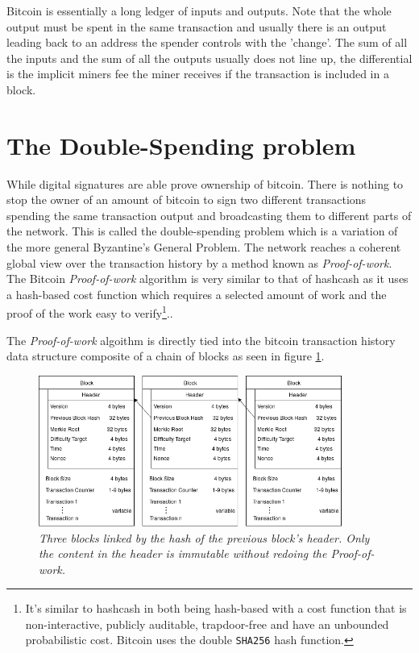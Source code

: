 Bitcoin is essentially a long ledger of inputs and outputs. Note that the whole output must be spent in the same transaction and usually there is an output leading back to an address the spender controls with the 'change'. The sum of all the inputs and the sum of all the outputs usually does not line up, the differential is the implicit miners fee the miner receives if the transaction is included in a block. 

\section{The Double-Spending problem}

While digital signatures are able prove ownership of bitcoin. There is nothing to stop the owner of an amount of bitcoin to sign two different transactions spending the same transaction output and broadcasting them to different parts of the network. This is called the double-spending problem which is a variation of the more general Byzantine's General Problem. The network reaches a coherent global view over the transaction history by a method known as \textit{Proof-of-work}. The Bitcoin \textit{Proof-of-work} algorithm is very similar to that of hashcash as it uses a hash-based cost function which requires a selected amount of work and the proof of the work easy to verify\cite{back:hashcash}\footnote{It's similar to hashcash in both being hash-based with a cost function that is non-interactive, publicly auditable, trapdoor-free and have an unbounded probabilistic cost\cite{back:hashcash}.
Bitcoin uses the double \texttt{SHA256} hash function.}..

The \textit{Proof-of-work} algoithm is directly tied into the bitcoin transaction history data structure composite of a chain of blocks as seen in figure \ref{fig:blockchain}.

\begin{figure}[!htb]
	\hspace*{-0.4cm} 
	\centering
	\includegraphics[width=10cm]{images/blockchain.png}
	\caption{\textit{Three blocks linked by the hash of the previous block's header. Only the content in the header is immutable without redoing the \textit{Proof-of-work}.
	}}
	\label{fig:blockchain}
	\hspace{2mm} 
\end{figure}

